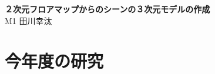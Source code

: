 \documentclass[]{jarticle}          %
\begin{document}

\vspace*{2ex}
\begin{center}
 {\Large \bf ２次元フロアマップからのシーンの３次元モデルの作成}\\ %
 \vspace*{5mm}
 {\large M1 田川幸汰}%
\end{center}





\section{今年度の研究}
\end{document}
